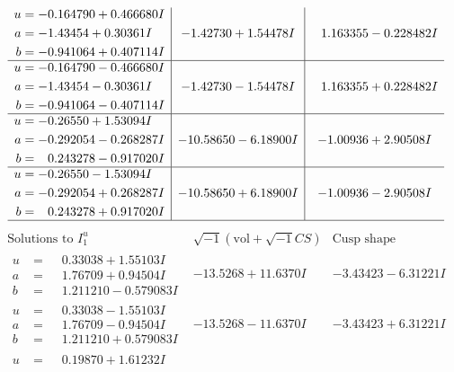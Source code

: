 \documentclass[1p]{elsarticle_modified}
\theoremstyle{definition}
\newcommand{\I}{\sqrt{-1}}
\begin{document}
$$\begin{array}{c|c|c}
\begin{aligned}
u &= -0.164790 + 0.466680 I \\
a &= -1.43454 + 0.30361 I \\
b &= -0.941064 + 0.407114 I\end{aligned}
 & -1.42730 + 1.54478 I & \phantom{-}1.163355 - 0.228482 I \\ \hline\begin{aligned}
u &= -0.164790 - 0.466680 I \\
a &= -1.43454 - 0.30361 I \\
b &= -0.941064 - 0.407114 I\end{aligned}
 & -1.42730 - 1.54478 I & \phantom{-}1.163355 + 0.228482 I \\ \hline\begin{aligned}
u &= -0.26550 + 1.53094 I \\
a &= -0.292054 - 0.268287 I \\
b &= \phantom{-}0.243278 - 0.917020 I\end{aligned}
 & -10.58650 - 6.18900 I & -1.00936 + 2.90508 I \\ \hline\begin{aligned}
u &= -0.26550 - 1.53094 I \\
a &= -0.292054 + 0.268287 I \\
b &= \phantom{-}0.243278 + 0.917020 I\end{aligned}
 & -10.58650 + 6.18900 I & -1.00936 - 2.90508 I\\
 \hline 
 \end{array}$$\newpage$$\begin{array}{c|c|c}  
\text{Solutions to }I^u_{1}& \I (\text{vol} + \sqrt{-1}CS) & \text{Cusp shape}\\
 \hline 
\begin{aligned}
u &= \phantom{-}0.33038 + 1.55103 I \\
a &= \phantom{-}1.76709 + 0.94504 I \\
b &= \phantom{-}1.211210 - 0.579083 I\end{aligned}
 & -13.5268 + 11.6370 I & -3.43423 - 6.31221 I \\ \hline\begin{aligned}
u &= \phantom{-}0.33038 - 1.55103 I \\
a &= \phantom{-}1.76709 - 0.94504 I \\
b &= \phantom{-}1.211210 + 0.579083 I\end{aligned}
 & -13.5268 - 11.6370 I & -3.43423 + 6.31221 I \\ \hline\begin{aligned}
u &= \phantom{-}0.19870 + 1.61232 I \\

\end{aligned}
\end{array}$$
\end{document}
